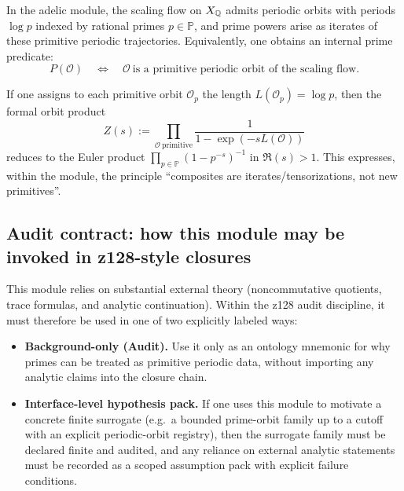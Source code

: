\begin{proposition}
\label{prop:adelic_prime_orbits}
\AuditTag In the adelic module, the scaling flow on $X_{\mathbb{Q}}$ admits periodic orbits with periods $\log p$ indexed by rational primes $p\in\mathbb{P}$, and prime powers arise as iterates of these primitive periodic trajectories.
Equivalently, one obtains an internal prime predicate:
\[
P(\mathcal{O})\quad\Longleftrightarrow\quad \mathcal{O}\ \text{is a primitive periodic orbit of the scaling flow}.
\]
\end{proposition}

\begin{remark}
\InterfaceTag If one assigns to each primitive orbit $\mathcal{O}_p$ the length $L(\mathcal{O}_p)=\log p$, then the formal orbit product
\[
Z(s):=\prod_{\mathcal{O}\ \mathrm{primitive}}\frac{1}{1-\exp(-sL(\mathcal{O}))}
\]
reduces to the Euler product $\prod_{p\in\mathbb{P}}(1-p^{-s})^{-1}$ in $\Re(s)>1$.
This expresses, within the module, the principle ``composites are iterates/tensorizations, not new primitives''.
\end{remark}

\subsection{Audit contract: how this module may be invoked in z128-style closures}
\label{subsec:adelic_module_contract}

\begin{remark}
\AuditTag This module relies on substantial external theory (noncommutative quotients, trace formulas, and analytic continuation).
Within the z128 audit discipline, it must therefore be used in one of two explicitly labeled ways:
\begin{itemize}
\item \textbf{Background-only (Audit).} Use it only as an ontology mnemonic for why primes can be treated as primitive periodic data, without importing any analytic claims into the closure chain.
\item \textbf{Interface-level hypothesis pack.} If one uses this module to motivate a concrete finite surrogate (e.g.\ a bounded prime-orbit family up to a cutoff with an explicit periodic-orbit registry), then the surrogate family must be declared finite and audited, and any reliance on external analytic statements must be recorded as a scoped assumption pack with explicit failure conditions.
\end{itemize}
\end{remark}

